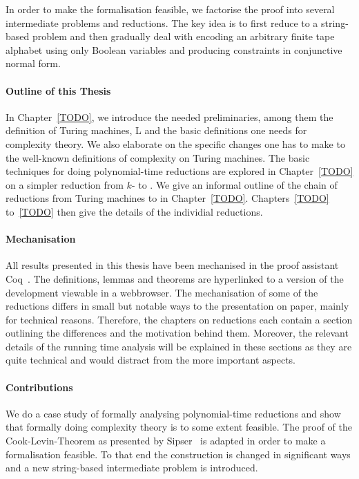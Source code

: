 In order to make the formalisation feasible, we factorise the proof into several intermediate problems and reductions. The key idea is to first reduce to a string-based problem and then gradually deal with encoding an arbitrary finite tape alphabet using only Boolean variables and producing constraints in conjunctive normal form. 

\paragraph{Outline of this Thesis}
In Chapter~\ref{TODO}, we introduce the needed preliminaries, among them the definition of Turing machines, L and the basic definitions one needs for complexity theory. We also elaborate on the specific changes one has to make to the well-known definitions of complexity on Turing machines.
The basic techniques for doing polynomial-time reductions are explored in Chapter~\ref{TODO} on a simpler reduction from $k$-\SAT{} to \Clique{}.
We give an informal outline of the chain of reductions from Turing machines to \SAT{} in Chapter~\ref{TODO}. 
Chapters~\ref{TODO} to~\ref{TODO} then give the details of the individial reductions.

\paragraph{Mechanisation}
All results presented in this thesis have been mechanised in the proof assistant Coq~\cite{TODO}. The definitions, lemmas and theorems are hyperlinked to a version of the development viewable in a webbrowser.
The mechanisation of some of the reductions differs in small but notable ways to the presentation on paper, mainly for technical reasons. Therefore, the chapters on reductions each contain a section outlining the differences and the motivation behind them. Moreover, the relevant details of the running time analysis will be explained in these sections as they are quite technical and would distract from the more important aspects.

\paragraph{Contributions}
We do a case study of formally analysing polynomial-time reductions and show that formally doing complexity theory is to some extent feasible.
The proof of the Cook-Levin-Theorem as presented by Sipser~\cite{TODO} is adapted in order to make a formalisation feasible. To that end the construction is changed in significant ways and a new string-based intermediate problem is introduced. 




